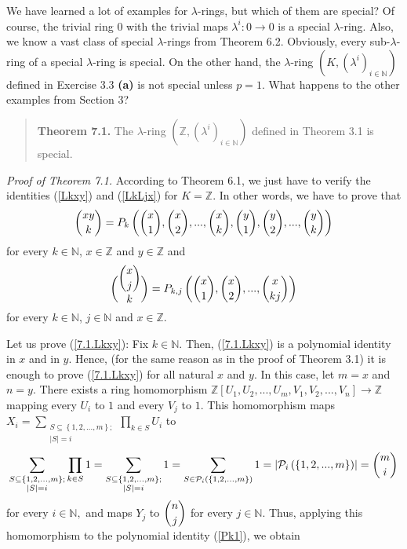 \documentclass[12pt,final,notitlepage,onecolumn,german]{article}%
\begin{document}
\begin{center}
\end{center}

We have learned a lot of examples for $\lambda$-rings, but which of them are
special? Of course, the trivial ring $0$ with the trivial maps $\lambda
^{i}:0\rightarrow0$ is a special $\lambda$-ring. Also, we know a vast class of
special $\lambda$-rings from Theorem 6.2. Obviously, every sub-$\lambda$-ring
of a special $\lambda$-ring is special. On the other hand, the $\lambda$-ring
$\left(  K,\left(  \lambda^{i}\right)  _{i\in\mathbb{N}}\right)  $ defined in
Exercise 3.3 \textbf{(a)} is not special unless $p=1$. What happens to the
other examples from Section 3?

\begin{quote}
\textbf{Theorem 7.1.} The $\lambda$-ring $\left(  \mathbb{Z},\left(
\lambda^{i}\right)  _{i\in\mathbb{N}}\right)  $ defined in Theorem 3.1 is special.
\end{quote}

\textit{Proof of Theorem 7.1.} According to Theorem 6.1, we just have to
verify the identities (\ref{Lkxy}) and (\ref{LkLjx}) for $K=\mathbb{Z}$. In
other words, we have to prove that%
\begin{equation}
\dbinom{xy}{k}=P_{k}\left(  \dbinom{x}{1},\dbinom{x}{2},...,\dbinom{x}%
{k},\dbinom{y}{1},\dbinom{y}{2},...,\dbinom{y}{k}\right)  \label{7.1.Lkxy}%
\end{equation}
for every $k\in\mathbb{N}$, $x\in\mathbb{Z}$ and $y\in\mathbb{Z}$ and%
\begin{equation}
\dbinom{\dbinom{x}{j}}{k}=P_{k,j}\left(  \dbinom{x}{1},\dbinom{x}%
{2},...,\dbinom{x}{kj}\right)  \label{7.1.LkLjx}%
\end{equation}
for every $k\in\mathbb{N}$, $j\in\mathbb{N}$ and $x\in\mathbb{Z}.$

Let us prove (\ref{7.1.Lkxy}): Fix $k\in\mathbb{N}$. Then, (\ref{7.1.Lkxy}) is
a polynomial identity in $x$ and in $y.$ Hence, (for the same reason as in the
proof of Theorem 3.1) it is enough to prove (\ref{7.1.Lkxy}) for all natural
$x$ and $y$. In this case, let $m=x$ and $n=y$. There exists a ring
homomorphism $\mathbb{Z}\left[  U_{1},U_{2},...,U_{m},V_{1},V_{2}%
,...,V_{n}\right]  \rightarrow\mathbb{Z}$ mapping every $U_{i}$ to $1$ and
every $V_{j}$ to $1$. This homomorphism maps $X_{i}=\sum
\limits_{\substack{S\subseteq\left\{  1,2,...,m\right\}  ;\\\left\vert
S\right\vert =i}}\prod\limits_{k\in S}U_{i}$ to%
\[
\sum\limits_{\substack{S\subseteq\left\{  1,2,...,m\right\}  ;\\\left\vert
S\right\vert =i}}\prod\limits_{k\in S}1=\sum\limits_{\substack{S\subseteq
\left\{  1,2,...,m\right\}  ;\\\left\vert S\right\vert =i}}1=\sum
\limits_{S\in\mathcal{P}_{i}\left(  \left\{  1,2,...,m\right\}  \right)
}1=\left\vert \mathcal{P}_{i}\left(  \left\{  1,2,...,m\right\}  \right)
\right\vert =\dbinom{m}{i}%
\]
for every $i\in\mathbb{N},$ and maps $Y_{j}$ to $\dbinom{n}{j}$ for every
$j\in\mathbb{N}$. Thus, applying this homomorphism to the polynomial identity
(\ref{Pk1}), we obtain%
\end{document}
